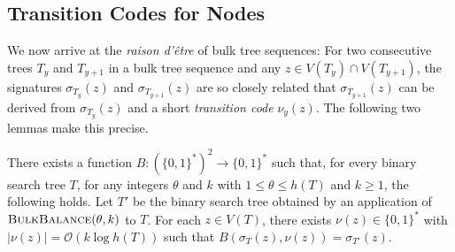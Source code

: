 \documentclass[kpfonts]{patmorin}
\newcommand{\Oh}{\mathcal{O}}
\let\leq\leqslant
\let\geq\geqslant
\begin{document}
\subsection{Transition Codes for Nodes}

We now arrive at the \emph{raison d'être} of bulk tree sequences:  For two consecutive trees $T_y$ and $T_{y+1}$ in a bulk tree sequence and any $z\in V(T_y)\cap V(T_{y+1})$, the signatures $\sigma_{T_y}(z)$ and $\sigma_{T_{y+1}}(z)$ are so closely related that $\sigma_{T_{y+1}}(z)$ can be derived from $\sigma_{T_y}(z)$ and a short \emph{transition code} $\nu_y(z)$.  The following two lemmas make this precise.

\begin{lem}
  There exists a function $B:(\{0,1\}^*)^2\to\{0,1\}^*$ such that, 
  for every binary search tree $T$, for any integers $\theta$ and $k$ with $1\leq \theta \leq h(T)$ and $k\geq1$, the following holds.
  Let $T'$ be the binary search tree obtained by an application of $\textsc{BulkBalance}(\theta,k)$ to $T$.
  For each $z\in V(T)$, there exists $\nu(z)\in\{0,1\}^*$ with $|\nu(z)| = \Oh(k\log h(T))$ such that $B(\sigma_{T}(z), \nu(z)) = \sigma_{T'}(z)$.
\end{lem}
\end{document}
